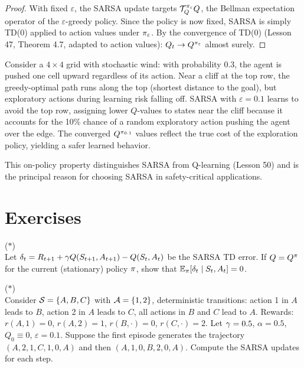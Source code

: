 \documentclass[11pt,a4paper]{article}
\begin{document}
\begin{proof}
With fixed $\varepsilon$, the SARSA update targets
$\mathcal{T}^{\pi_\varepsilon}_Q Q$, the Bellman expectation
operator of the $\varepsilon$-greedy policy. Since the policy is
now fixed, SARSA is simply TD(0) applied to action values under
$\pi_\varepsilon$. By the convergence of TD(0)
(Lesson 47, Theorem 4.7, adapted to action values):
$Q_t \to Q^{\pi_\varepsilon}$ almost surely.
\end{proof}

\begin{example}
\label{ex:on_off_policy}
Consider a $4 \times 4$ grid with stochastic wind: with probability
0.3, the agent is pushed one cell upward regardless of its action.
Near a cliff at the top row, the greedy-optimal path runs along the
top (shortest distance to the goal), but exploratory actions during
learning risk falling off. SARSA with $\varepsilon = 0.1$ learns
to avoid the top row, assigning lower $Q$-values to states near
the cliff because it accounts for the 10\% chance of a random
exploratory action pushing the agent over the edge. The converged
$Q^{\pi_{0.1}}$ values reflect the true cost of the exploration
policy, yielding a safer learned behavior.
\end{example}

This on-policy property distinguishes SARSA from Q-learning (Lesson
50) and is the principal reason for choosing SARSA in safety-critical
applications.

\section{Exercises}
\label{sec:exercises}

\begin{exercise}
\textnormal{(\(*\))} \\
Let $\delta_t = R_{t+1} + \gamma Q(S_{t+1}, A_{t+1})
- Q(S_t, A_t)$ be the SARSA TD error. If $Q = Q^{\pi}$ for the
current (stationary) policy $\pi$, show that
$\mathbb{E}_\pi[\delta_t \mid S_t, A_t] = 0$.
\end{exercise}

\begin{exercise}
\textnormal{(\(*\))} \\
Consider $\mathcal{S} = \{A, B, C\}$ with $\mathcal{A} = \{1, 2\}$,
deterministic transitions: action 1 in $A$ leads to $B$, action 2
in $A$ leads to $C$, all actions in $B$ and $C$ lead to $A$.
Rewards: $r(A,1) = 0$, $r(A,2) = 1$, $r(B,\cdot) = 0$,
$r(C,\cdot) = 2$. Let $\gamma = 0.5$, $\alpha = 0.5$,
$Q_0 \equiv 0$, $\varepsilon = 0.1$. Suppose the first episode
generates the trajectory $(A,2,1,C,1,0,A)$ and then
$(A,1,0,B,2,0,A)$. Compute the SARSA updates for each step.
\end{exercise}
\end{document}

